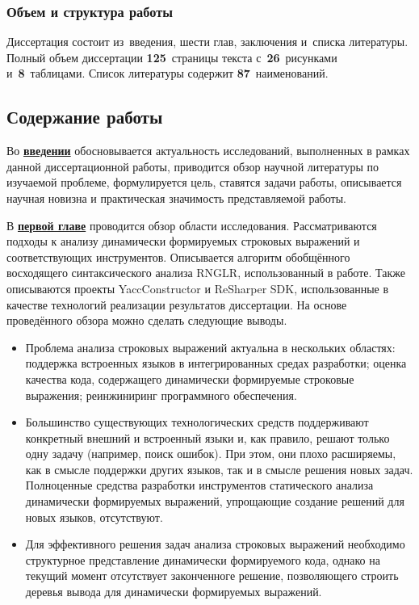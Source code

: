 \subsubsection*{\large{Объем и структура работы}}
Диссертация состоит из~введения, шести глав, заключения и~списка литературы. Полный объем диссертации \textbf{125}~страницы текста с~\textbf{26}~рисунками и~\textbf{8}~таблицами. Список литературы содержит \textbf{87}~наименований.

\subsection*{\Large Содержание работы}
Во \underline{\textbf{введении}} обосновывается актуальность исследований, выполненных в рамках данной диссертационной работы, приводится обзор научной литературы по изучаемой проблеме, формулируется цель, 
ставятся задачи работы, описывается научная новизна и практическая значимость представляемой работы.


В \underline{\textbf{первой главе}} проводится обзор области исследования. Рассматриваются подходы к анализу динамически формируемых строковых 
выражений и соответствующих инструментов. Описывается алгоритм обобщённого восходящего синтаксического анализа RNGLR, использованный в работе. Также описываются 
проекты YaccConstructor и ReSharper SDK, использованные в качестве технологий реализации результатов диссертации. На основе проведённого обзора можно сделать следующие выводы.

\begin{itemize}
    \item Проблема анализа строковых выражений актуальна в нескольких областях: поддержка встроенных языков в интегрированных средах разработки; оценка качества кода, содержащего динамически формируемые строковые выражения; реинжиниринг программного обеспечения.
    \item Большинство существующих технологических средств поддерживают конкретный внешний и встроенный языки и, как правило, решают только одну задачу (например, поиск ошибок). При этом, они плохо расширяемы, как в смысле поддержки других языков, так и в смысле решения новых задач. Полноценные средства разработки инструментов статического анализа динамически формируемых выражений, упрощающие создание решений для новых языков, отсутствуют.
    \item Для эффективного решения задач анализа строковых выражений необходимо структурное представление динамически формируемого кода, однако на текущий момент отсутствует законченноге решение, позволяющего строить деревья вывода для динамически формируемых выражений.
\end{itemize}

